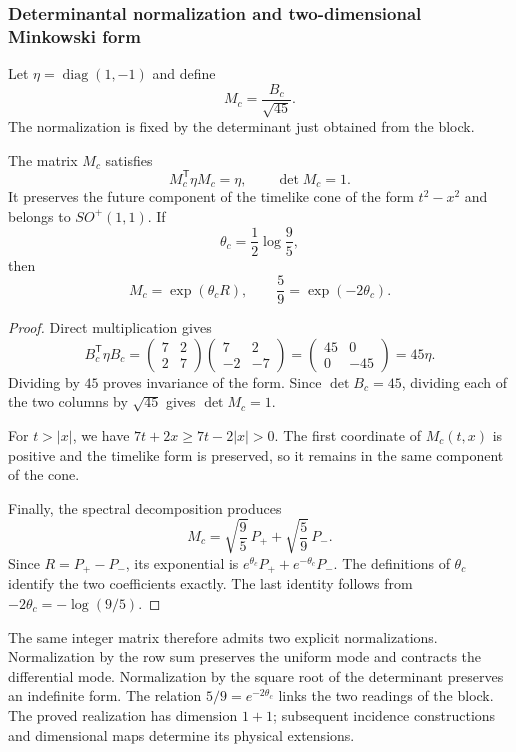 \subsubsection{Determinantal normalization and two-dimensional Minkowski form}

Let $\eta=\operatorname{diag}(1,-1)$ and define
\[
 M_c=\frac{B_c}{\sqrt{45}}.
\]
The normalization is fixed by the determinant just obtained from the block.

\begin{teorema}
\label{geo:thm-lorentz}
The matrix $M_c$ satisfies
\[
 M_c^{\mathsf T}\eta M_c=\eta,
 \qquad \det M_c=1.
\]
It preserves the future component of the timelike cone of the form $t^2-x^2$ and belongs to $SO^+(1,1)$. If
\[
 \theta_c=\frac12\log\frac95,
\]
then
\[
 M_c=\exp(\theta_cR),\qquad
 \frac59=\exp(-2\theta_c).
\]
\end{teorema}

\begin{proof}
Direct multiplication gives
\[
 B_c^{\mathsf T}\eta B_c
 =\begin{pmatrix}7&2\\2&7\end{pmatrix}
  \begin{pmatrix}7&2\\-2&-7\end{pmatrix}
 =\begin{pmatrix}45&0\\0&-45\end{pmatrix}
 =45\eta.
\]
Dividing by $45$ proves invariance of the form. Since $\det B_c=45$, dividing each of the two columns by $\sqrt{45}$ gives $\det M_c=1$.

For $t>|x|$, we have $7t+2x\geq7t-2|x|>0$. The first coordinate of $M_c(t,x)$ is positive and the timelike form is preserved, so it remains in the same component of the cone.

Finally, the spectral decomposition produces
\[
 M_c=\sqrt{\frac95}\,P_++\sqrt{\frac59}\,P_-.
\]
Since $R=P_+-P_-$, its exponential is $e^{\theta_c}P_++e^{-\theta_c}P_-$. The definitions of $\theta_c$ identify the two coefficients exactly. The last identity follows from $-2\theta_c=-\log(9/5)$.
\end{proof}

The same integer matrix therefore admits two explicit normalizations. Normalization by the row sum preserves the uniform mode and contracts the differential mode. Normalization by the square root of the determinant preserves an indefinite form. The relation $5/9=e^{-2\theta_c}$ links the two readings of the block. The proved realization has dimension $1+1$; subsequent incidence constructions and dimensional maps determine its physical extensions.

